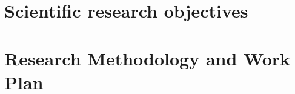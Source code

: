 \documentclass[11pt]{article}
\begin{document}
\section*{Scientific research objectives}


\section*{Research Methodology and Work Plan}



\scriptsize

\end{document}
